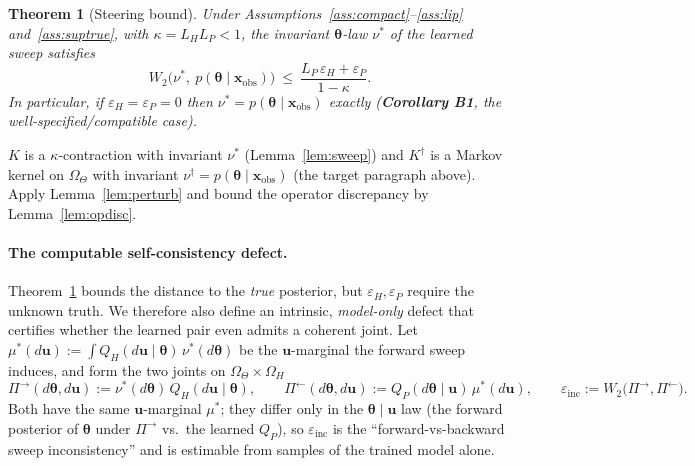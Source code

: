 \documentclass[11pt]{article}
\makeatletter
\theoremstyle{definitionbreak}
\theoremstyle{plainbreak}
\newtheorem{theorem}{Theorem}[section]
\theoremstyle{remarkbreak}
\renewenvironment{proof}[1][\proofname]{\par
  \pushQED{\qed}\normalfont
  \topsep6\p@\@plus6\p@\relax
  \trivlist
  \item[\hskip\labelsep\itshape #1\@addpunct{.}]\mbox{}\par\nobreak\ignorespaces
}{\popQED\endtrivlist\@endpefalse}
\newcommand{\Om}{\Omega}
\newcommand{\xobs}{\bm{x}_{\mathrm{obs}}}
\newcommand{\bth}{\bm{\theta}}
\makeatother
\begin{document}
\begin{theorem}[Steering bound]
\label{thm:B}
Under Assumptions~\ref{ass:compact}--\ref{ass:lip} and~\ref{ass:suptrue}, with $\kappa=L_HL_P<1$, the
invariant $\bth$-law $\nu^\ast$ of the learned sweep satisfies
\[
  W_2\big(\nu^\ast,\ p(\bth\mid\xobs)\big)\ \le\ \frac{L_P\,\varepsilon_H+\varepsilon_P}{1-\kappa}.
\]
In particular, if $\varepsilon_H=\varepsilon_P=0$ then $\nu^\ast=p(\bth\mid\xobs)$ exactly
(\textbf{Corollary B1}, the well-specified/compatible case).
\end{theorem}
\begin{proof}
$K$ is a $\kappa$-contraction with invariant $\nu^\ast$ (Lemma~\ref{lem:sweep}) and $K^\dagger$ is a
Markov kernel on $\Om_\Theta$ with invariant $\nu^\dagger=p(\bth\mid\xobs)$ (the target paragraph
above). Apply Lemma~\ref{lem:perturb} and bound the operator discrepancy by Lemma~\ref{lem:opdisc}.
\end{proof}

\paragraph{The computable self-consistency defect.}
Theorem~\ref{thm:B} bounds the distance to the \emph{true} posterior, but
$\varepsilon_H,\varepsilon_P$ require the unknown truth. We therefore also define an intrinsic,
\emph{model-only} defect that certifies whether the learned pair even admits a coherent joint. Let
$\mu^\ast(d\bm u):=\int Q_H(d\bm u\mid\bth)\,\nu^\ast(d\bth)$ be the $\bm u$-marginal the forward
sweep induces, and form the two joints on $\Om_\Theta\times\Om_H$
\[
  \Pi^{\rightarrow}(d\bth,d\bm u):=\nu^\ast(d\bth)\,Q_H(d\bm u\mid\bth),\qquad
  \Pi^{\leftarrow}(d\bth,d\bm u):=Q_P(d\bth\mid\bm u)\,\mu^\ast(d\bm u),\qquad
  \varepsilon_{\mathrm{inc}}:=W_2\big(\Pi^{\rightarrow},\Pi^{\leftarrow}\big).
\]
Both have the same $\bm u$-marginal $\mu^\ast$; they differ only in the $\bth\mid\bm u$ law (the
forward posterior of $\bth$ under $\Pi^\rightarrow$ vs.\ the learned $Q_P$), so
$\varepsilon_{\mathrm{inc}}$ is the ``forward-vs-backward sweep inconsistency'' and is estimable from
samples of the trained model alone.
\end{document}
